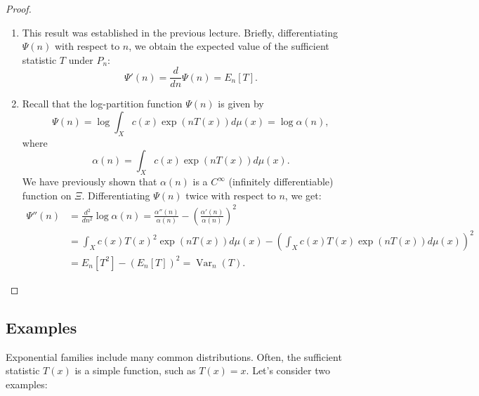 \documentclass[open=any, 11pt,paper=A4]{scrreprt}
\begin{document}
\begin{proof}
\begin{enumerate}
    \item This result was established in the previous lecture. Briefly, differentiating $\Psi(n)$ with respect to $n$, we obtain the expected value of the sufficient statistic $T$ under $P_n$:
    \[
    \Psi'(n) = \frac{d}{dn} \Psi(n) = E_n[T].
    \]

    \item Recall that the log-partition function $\Psi(n)$ is given by
    \[
    \Psi(n) = \log \int_X c(x) \exp\left( n T(x) \right) d\mu(x) = \log \alpha(n),
    \]
    where
    \[
    \alpha(n) = \int_X c(x) \exp\left( n T(x) \right) d\mu(x).
    \]
    We have previously shown that $\alpha(n)$ is a $C^\infty$ (infinitely differentiable) function on $\Xi$. Differentiating $\Psi(n)$ twice with respect to $n$, we get:
    \begin{align*}
    \Psi''(n) &= \frac{d^2}{dn^2} \log \alpha(n) = \frac{\alpha''(n)}{\alpha(n)} - \left( \frac{\alpha'(n)}{\alpha(n)} \right)^2 \\
    &= \int_X c(x) T(x)^2 \exp\left( n T(x) \right) d\mu(x) - \left( \int_X c(x) T(x) \exp\left( n T(x) \right) d\mu(x) \right)^2 \\
    &= E_n[T^2] - (E_n[T])^2 = \operatorname{Var}_n(T).
    \end{align*}
\end{enumerate}
\end{proof}

\subsection{Examples}

Exponential families include many common distributions. Often, the sufficient statistic $T(x)$ is a simple function, such as $T(x) = x$. Let's consider two examples:
\end{document}
